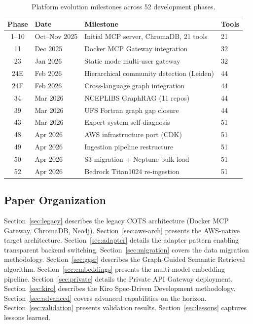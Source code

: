 \documentclass[11pt,letterpaper]{article}
\begin{document}
\begin{table}[H]
\centering
\footnotesize
\begin{tabular}{@{}clll@{}}
\toprule
\textbf{Phase} & \textbf{Date} & \textbf{Milestone} & \textbf{Tools} \\
\midrule
1--10  & Oct--Nov 2025 & Initial MCP server, ChromaDB, 21 tools & 21 \\
11     & Dec 2025      & Docker MCP Gateway integration & 32 \\
23     & Jan 2026      & Static mode multi-user gateway & 32 \\
24E    & Feb 2026      & Hierarchical community detection (Leiden) & 44 \\
24F    & Feb 2026      & Cross-language graph integration & 44 \\
34     & Mar 2026      & NCEPLIBS GraphRAG (11 repos) & 44 \\
39     & Mar 2026      & UFS Fortran graph gap closure & 44 \\
43     & Mar 2026      & Expert system self-diagnosis & 51 \\
48     & Apr 2026      & AWS infrastructure port (CDK) & 51 \\
49     & Apr 2026      & Ingestion pipeline restructure & 51 \\
50     & Apr 2026      & S3 migration + Neptune bulk load & 51 \\
52     & Apr 2026      & Bedrock Titan1024 re-ingestion & 51 \\
\bottomrule
\end{tabular}
\caption{Platform evolution milestones across 52 development phases.}
\label{tab:evolution}
\end{table}

\subsection{Paper Organization}

Section~\ref{sec:legacy} describes the legacy COTS architecture (Docker MCP
Gateway, ChromaDB, Neo4j). Section~\ref{sec:aws-arch} presents the AWS-native
target architecture. Section~\ref{sec:adapter} details the adapter pattern
enabling transparent backend switching. Section~\ref{sec:migration} covers
the data migration methodology. Section~\ref{sec:ggsr} describes the
Graph-Guided Semantic Retrieval algorithm. Section~\ref{sec:embeddings}
presents the multi-model embedding pipeline. Section~\ref{sec:private}
details the Private API Gateway deployment. Section~\ref{sec:kiro} describes
the Kiro Spec-Driven Development methodology. Section~\ref{sec:advanced}
covers advanced capabilities on the horizon. Section~\ref{sec:validation}
presents validation results. Section~\ref{sec:lessons} captures lessons
learned.
\end{document}
